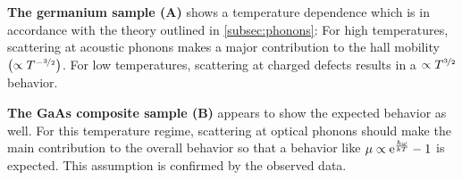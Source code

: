 \textbf{The germanium sample (A)} shows a temperature dependence which is in accordance with the theory outlined in \autoref{subsec:phonons}: For high temperatures, scattering at acoustic phonons makes a major contribution to the hall mobility $\left(\propto T^{-\nicefrac{3}{2}}\right)$.
For low temperatures, scattering at charged defects results in a $\propto T^{\nicefrac{3}{2}}$ behavior.

\textbf{The GaAs composite sample (B)} appears to show the expected behavior as well.
For this temperature regime, scattering at optical phonons should make the main contribution to the overall behavior so that a behavior like $\mu\propto \mathrm{e}^\frac{\hbar \omega}{k T} - 1$ is expected.
This assumption is confirmed by the observed data.
